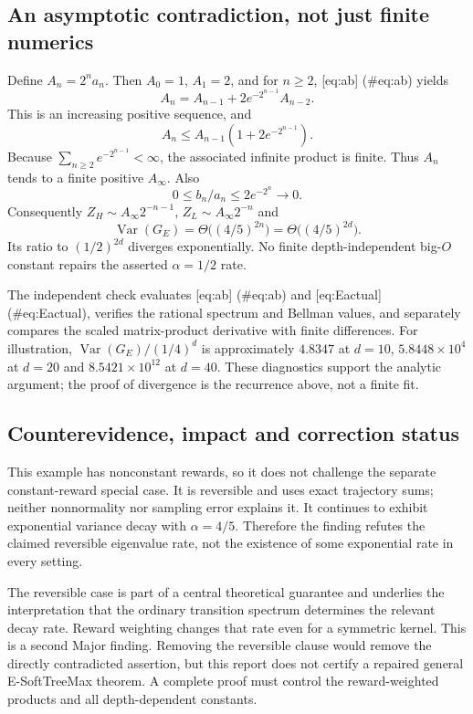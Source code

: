 \documentclass[10pt]{article}
\begin{document}
\subsection*{An asymptotic contradiction, not just finite numerics}
Define \(A_n=2^na_n\). Then \(A_0=1\), \(A_1=2\), and for \(n\ge2\), [eq:ab] (\#eq:ab) yields \[A_n=A_{n-1}+2e^{-2^{n-1}}A_{n-2}.\] This is an increasing positive sequence, and \[A_n\le A_{n-1}(1+2e^{-2^{n-1}}).\] Because \(\sum_{n\ge2}e^{-2^{n-1}}<\infty\), the associated infinite product is finite. Thus \(A_n\) tends to a finite positive \(A_\infty\). Also \[0\le b_n/a_n\le2e^{-2^n}\longrightarrow0.\] Consequently \(Z_H\sim A_\infty 2^{-n-1}\), \(Z_L\sim A_\infty2^{-n}\) and \[\operatorname{Var}(G_E)=\Theta\bigl((4/5)^{2n}\bigr)
          =\Theta\bigl((4/5)^{2d}\bigr).\] Its ratio to \((1/2)^{2d}\) diverges exponentially. No finite depth-independent big-\(O\) constant repairs the asserted \(\alpha=1/2\) rate.\par
The independent check evaluates [eq:ab] (\#eq:ab) and [eq:Eactual] (\#eq:Eactual), verifies the rational spectrum and Bellman values, and separately compares the scaled matrix-product derivative with finite differences. For illustration, \(\operatorname{Var}(G_E)/(1/4)^d\) is approximately \(4.8347\) at \(d=10\), \(5.8448\times10^4\) at \(d=20\) and \(8.5421\times10^{12}\) at \(d=40\). These diagnostics support the analytic argument; the proof of divergence is the recurrence above, not a finite fit.\par
\subsection*{Counterevidence, impact and correction status}
This example has nonconstant rewards, so it does not challenge the separate constant-reward special case. It is reversible and uses exact trajectory sums; neither nonnormality nor sampling error explains it. It continues to exhibit exponential variance decay with \(\alpha=4/5\). Therefore the finding refutes the claimed reversible eigenvalue rate, not the existence of some exponential rate in every setting.\par
The reversible case is part of a central theoretical guarantee and underlies the interpretation that the ordinary transition spectrum determines the relevant decay rate. Reward weighting changes that rate even for a symmetric kernel. This is a second Major finding. Removing the reversible clause would remove the directly contradicted assertion, but this report does not certify a repaired general E-SoftTreeMax theorem. A complete proof must control the reward-weighted products and all depth-dependent constants.\par
\end{document}
